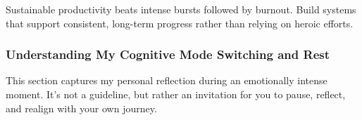 \documentclass[11pt,a4paper]{article}
\begin{document}
\begin{tcolorbox}[colback=yellow!10,colframe=red!50,title={Remember: PhD is a Marathon, Not a Sprint}]
Sustainable productivity beats intense bursts followed by burnout. Build systems that support consistent, long-term progress rather than relying on heroic efforts.
\end{tcolorbox}

\subsubsection{Understanding My Cognitive Mode Switching and Rest}

\begin{tcolorbox}[colback=blue!5,colframe=blue!40,title={\faThumbtack~Author's Note}]
This section captures my personal reflection during an emotionally intense moment. It's not a guideline, but rather an invitation for you to pause, reflect, and realign with your own journey.
\end{tcolorbox}
\end{document}
